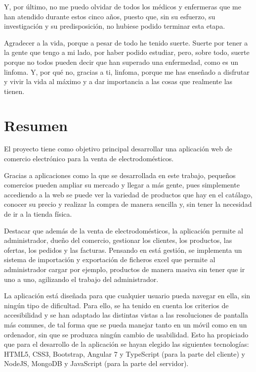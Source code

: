\documentclass[a4paper, 12pt]{book}
\begin{document}
Y, por último, no me puedo olvidar de todos los médicos y enfermeras que me han atendido durante estos cinco años, puesto que, sin su esfuerzo, su investigación y su predisposición, no hubiese podido terminar esta etapa. 

Agradecer a la vida, porque a pesar de todo he tenido suerte. Suerte por tener a la gente que tengo a mi lado, por haber podido estudiar, pero, sobre todo, suerte porque no todos pueden decir que han superado una enfermedad, como es un linfoma. Y, por qué no, gracias a ti, linfoma, porque me has enseñado a disfrutar y vivir la vida al máximo y a dar importancia a las cosas que realmente las tienen.


\chapter*{Resumen}

El proyecto tiene como objetivo principal desarrollar una aplicación web de comercio electrónico para la venta de electrodomésticos.

Gracias a aplicaciones como la que se desarrollada en este trabajo, pequeños comercios pueden ampliar su mercado y llegar a más gente, pues simplemente accediendo a la web se puede ver la variedad de productos que hay en el catálago, conocer su precio y realizar la compra de manera sencilla y, sin tener la necesidad de ir a la tienda física. 

Destacar que además de la venta de electrodomésticos, la aplicación permite al administrador, dueño del comercio, gestionar los clientes, los productos, las ofertas, los pedidos y las facturas. Pensando en está gestión, se implementa un sistema de importación y exportación de ficheros excel que permite al administrador cargar por ejemplo, productos de manera masiva sin tener que ir uno a uno, agilizando el trabajo del  administrador. 

La aplicación está diseñada para que cualquier usuario pueda navegar en ella, sin ningún tipo de dificultad. Para ello, se ha tenido en cuenta los criterios de accesibilidad y se han adaptado las distintas vistas a las resoluciones de pantalla más comunes, de tal forma que se pueda manejar tanto en un móvil como en un ordenador, sin que se produzca ningún cambio de usabilidad. Esto ha propiciado que para el desarrollo de la aplicación se  hayan elegido las siguientes tecnologías: HTML5, CSS3, Bootstrap, Angular 7 y TypeScript (para la parte del cliente) y NodeJS, MongoDB y JavaScript (para la parte del servidor).
\end{document}
